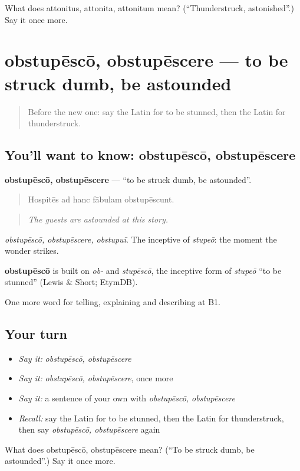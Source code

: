 \begin{tcolorbox}[breakable,colback=teal!4,colframe=teal!35!black,title={Before you move on}]
What does attonitus, attonita, attonitum mean? (\textquotedblleft{}Thunderstruck, astonished\textquotedblright{}.) Say it once more.
\end{tcolorbox}
\section[obstupēscō, obstupēscere]{obstupēscō, obstupēscere — to be struck dumb, be astounded}

\label{lesson:LA-C495-obstupesco}



\begin{quote}
Before the new one: say the Latin for to be stunned, then the Latin for thunderstruck.
\end{quote}

\subsection*{You'll want to know: obstupēscō, obstupēscere}
\textbf{obstupēscō, obstupēscere} — \textquotedblleft{}to be struck dumb, be astounded\textquotedblright{}.

\begin{quote}
Hospitēs ad hanc fābulam obstupēscunt.
\end{quote}

\begin{quote}
\emph{The guests are astounded at this story.}
\end{quote}

\emph{obstupēscō, obstupēscere, obstupuī}. The inceptive of \emph{stupeō}: the moment the wonder strikes.

\begin{cousinweb}
\textbf{obstupēscō} is built on \emph{ob-} and \emph{stupēscō}, the inceptive form of \emph{stupeō} \textquotedblleft{}to be stunned\textquotedblright{} (Lewis \& Short; EtymDB).
\end{cousinweb}

\begin{grammarlens}[title={What you've built}]
One more word for telling, explaining and describing at B1.
\end{grammarlens}

\subsection*{Your turn}
\begin{itemize}
\raggedright
  \item \emph{Say it:} \emph{obstupēscō, obstupēscere}
  \item \emph{Say it:} \emph{obstupēscō, obstupēscere}, once more
  \item \emph{Say it:} a sentence of your own with \emph{obstupēscō, obstupēscere}
  \item \emph{Recall:} say the Latin for to be stunned, then the Latin for thunderstruck, then say \emph{obstupēscō, obstupēscere} again
\end{itemize}

\begin{tcolorbox}[breakable,colback=teal!4,colframe=teal!35!black,title={Before you move on}]
What does obstupēscō, obstupēscere mean? (\textquotedblleft{}To be struck dumb, be astounded\textquotedblright{}.) Say it once more.
\end{tcolorbox}
